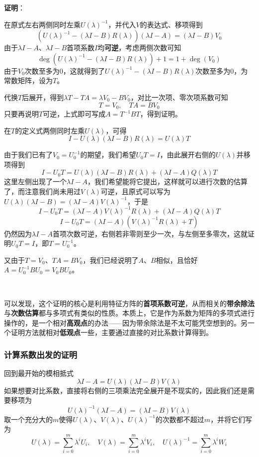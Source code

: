 \documentclass[a4paper,UTF8,fontset=windows,AutoFakeBold]{ctexart}
\newcommand{\proo}[1]{{\vspace{5pt}\kaishu\noindent\textbf{证明}：\vspace{-3pt}
\begin{compactitem}
    \item[] #1
\end{compactitem}
}}
\begin{document}
\proo{
    在原式左右两侧同时左乘$U(\lambda)^{-1}$，并代入$V$的表达式、移项得到
    $$(U(\lambda)^{-1}-(\lambda I-B)R(\lambda))(\lambda I-A)=(\lambda I-B)V_0$$
    由于$\lambda I-A$、$\lambda I-B$首项系数$I$均\textbf{可逆}，考虑两侧次数可知
    $$\deg(U(\lambda)^{-1}-(\lambda I-B)R(\lambda))+1=1+\deg(V_0)$$
    由于$V_0$次数至多为0，这就得到了$U(\lambda)^{-1}-(\lambda I-B)R(\lambda)$次数至多为0，为常数矩阵，设为$T$。

    代换$T$后展开，得到$\lambda T-TA=\lambda V_0-BV_0$，对比一次项、零次项系数可知
    $$T=V_0,\quad TA=BV_0$$
    只要再说明$T$可逆，上式即可写成$A=T^{-1}BT$，得到证明。

    在$T$的定义式两侧同时左乘$U(\lambda)$，可得
    $$I-U(\lambda)(\lambda I-B)R(\lambda)=U(\lambda) T$$
    
    由于我们已有了$V_0=U_0^{-1}$的期望，我们希望$U_0T=I$，由此展开右侧的$U(\lambda)$并移项得到
    $$I-U_0T=U(\lambda)(\lambda I-B)R(\lambda)+(\lambda I-A)Q(\lambda)T$$
    这里左侧出现了一个$\lambda I-A$，我们希望能将它提出，这样就可以进行次数的估算了，而注意我们尚未用过$V(\lambda)$可逆，且原式可以写为$U(\lambda)(\lambda I-B)=(\lambda I-A)V(\lambda)^{-1}$，于是
    $$I-U_0T=(\lambda I-A)V(\lambda)^{-1}R(\lambda)+(\lambda I-A)Q(\lambda)T$$
    $$I-U_0T=(\lambda I-A)(V(\lambda)^{-1}R(\lambda)+T)$$
    仍然因为$\lambda I-A$首项次数可逆，右侧若非零则至少一次，与左侧至多零次，这就证明$U_0T=I$，即$T=U_0^{-1}$。

    又由于$T=V_0$、$TA=BV_0$，我们已经说明了$A$、$B$相似，且恰好$A=U_0^{-1}BU_0=V_0BU_0$。
}

\

可以发现，这个证明的核心是利用特征方阵的\textbf{首项系数可逆}，从而相关的\textbf{带余除法}与\textbf{次数估算}都与多项式有类似的性质。本质上，它是作为系数为矩阵的多项式进行操作的，是一个相对\textbf{高观点}的办法——因为带余除法是不太可能凭空想到的。另一个证明方法就相对\textbf{低观点}一些，主要通过直接的对比系数计算得到。

\subsubsection{计算系数出发的证明}
回到最开始的模相抵式
$$\lambda I-A=U(\lambda)(\lambda I-B)V(\lambda)$$
如果想要对比系数，直接将右侧的三项乘法完全展开是不现实的，因此我们还是需要移项为
$$U(\lambda)^{-1}(\lambda I-A)=(\lambda I-B)V(\lambda)$$
取一个充分大的$m$使得$U(\lambda)$、$V(\lambda)$、$U(\lambda)^{-1}$的次数都不超过$m$，并将它们写为
$$U(\lambda)=\sum_{i=0}^m\lambda^iU_i,\quad V(\lambda)=\sum_{i=0}^m\lambda^iV_i,\quad U(\lambda)^{-1}=\sum_{i=0}^m\lambda^iW_i$$
\end{document}
